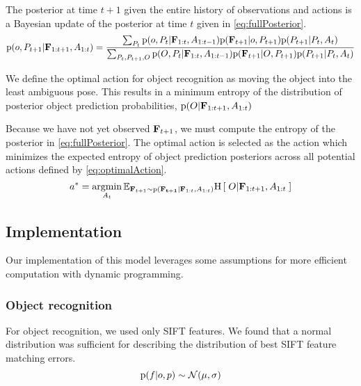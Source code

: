             The posterior at time $t+1$ given the entire history of observations and actions is a Bayesian update of the posterior at time $t$ given in \eqref{eq:fullPosterior}.
            \begin{equation}
                \label{eq:fullPosterior}
                \prob{o,P_{t+1}|\set{F}_{1:t+1},A_{1:t}} = \frac{ \sum_{P_t} \prob{o,P_t|\set{F}_{1:t},A_{1:t-1}} \prob{\set{F}_{t+1}|o,P_{t+1}} \prob{P_{t+1}|P_t,A_t}}{\sum_{P_t,P_{t+1},O} \prob{O,P_t|\set{F}_{1:t},A_{1:t-1}} \prob{\set{F}_{t+1}|O,P_{t+1}} \prob{P_{t+1}|P_t,A_t}}
            \end{equation}
            
            We define the optimal action for object recognition as moving the object into the least ambiguous pose. This results in a minimum entropy of the distribution of posterior object prediction probabilities, $\text{p}(O|\mathbf{F}_{1:t+1},A_{1:t})$

            Because we have not yet observed $\mathbf{F}_{t+1}$, we must compute the  entropy of the posterior in \eqref{eq:fullPosterior}. The optimal action is selected as the action which minimizes the expected entropy of object prediction posteriors across all potential actions defined by \eqref{eq:optimalAction}.
            \begin{equation}
                \label{eq:optimalAction}
                a^* = \argmin_{A_t} \expectedValue{ \entropy{O|\set{F}_{1:t+1},A_{1:t}} }{\set{F}_{t+1} \sim \prob{\set{F_{t+1}}|\set{F}_{1:t},A_{1:t}}}
            \end{equation}
            
    \subsection{Implementation}

        Our implementation of this model leverages some assumptions for more efficient computation with dynamic programming.

        \subsubsection{Object recognition}

            For object recognition, we used only SIFT features. We found that a normal distribution was sufficient for describing the distribution of best SIFT feature matching errors.
            \begin{equation}
                \text{p}(f|o,p) \sim \mathcal{N}(\mu,\sigma)
            \end{equation}

